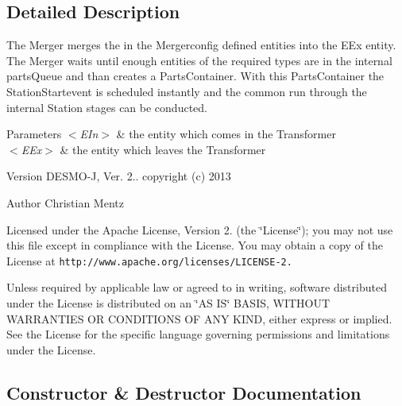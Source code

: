 \subsection{Detailed Description}
The Merger merges the in the Mergerconfig defined entities into the E\-Ex entity. The Merger waits until enough entities of the required types are in the internal parts\-Queue and than creates a Parts\-Container. With this Parts\-Container the Station\-Startevent is scheduled instantly and the common run through the internal Station stages can be conducted.


\begin{DoxyParams}{Parameters}
{\em $<$\-E\-In$>$} & the entity which comes in the Transformer \\
\hline
{\em $<$\-E\-Ex$>$} & the entity which leaves the Transformer\\
\hline
\end{DoxyParams}
\begin{DoxyVersion}{Version}
D\-E\-S\-M\-O-\/\-J, Ver. 2.. copyright (c) 2013 
\end{DoxyVersion}
\begin{DoxyAuthor}{Author}
Christian Mentz
\end{DoxyAuthor}
Licensed under the Apache License, Version 2. (the \char`\"{}\-License\char`\"{}); you may not use this file except in compliance with the License. You may obtain a copy of the License at {\tt http\-://www.\-apache.\-org/licenses/\-L\-I\-C\-E\-N\-S\-E-\/2.}

Unless required by applicable law or agreed to in writing, software distributed under the License is distributed on an \char`\"{}\-A\-S I\-S\char`\"{} B\-A\-S\-I\-S, W\-I\-T\-H\-O\-U\-T W\-A\-R\-R\-A\-N\-T\-I\-E\-S O\-R C\-O\-N\-D\-I\-T\-I\-O\-N\-S O\-F A\-N\-Y K\-I\-N\-D, either express or implied. See the License for the specific language governing permissions and limitations under the License. 

\subsection{Constructor \& Destructor Documentation}
